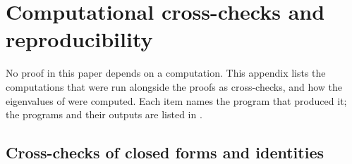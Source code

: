 \section{Computational cross-checks and reproducibility}\label{app:repro}

No proof in this paper depends on a computation. This appendix lists the computations that were
run alongside the proofs as cross-checks, and how the eigenvalues of  were
computed. Each item names the program that produced it; the programs and their outputs are listed in
.

\subsection{Cross-checks of closed forms and identities}

